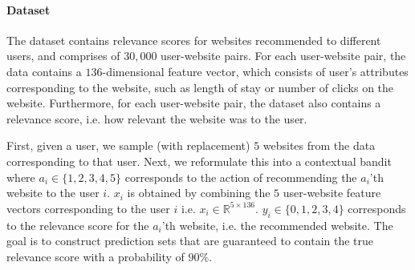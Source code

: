 \paragraph{Dataset}
The dataset contains relevance scores for websites recommended to different users, and comprises of $30,000$ user-website pairs. For each user-website pair, the data contains a $136$-dimensional feature vector, which consists of user's attributes corresponding to the website, such as length of stay or number of clicks on the website. Furthermore, for each user-website pair, the dataset also contains a relevance score, i.e. how relevant the website was to the user.


First, given a user, we sample (with replacement) $5$ websites from the data corresponding to that user. Next, we reformulate this into a contextual bandit where $a_i \in \{1,2,3,4,5\}$ corresponds to the action of recommending the $a_i$'th website to the user $i$. $x_i$ is obtained by combining the $5$ user-website feature vectors corresponding to the user $i$ i.e. $x_i \in \mathbb{R}^{5 \times 136}$. $y_i \in\{0,1,2,3,4\}$ corresponds to the relevance score for the $a_i$'th website, i.e. the recommended website. The goal is to construct prediction sets that are guaranteed to contain the true relevance score with a probability of $90\%$.


